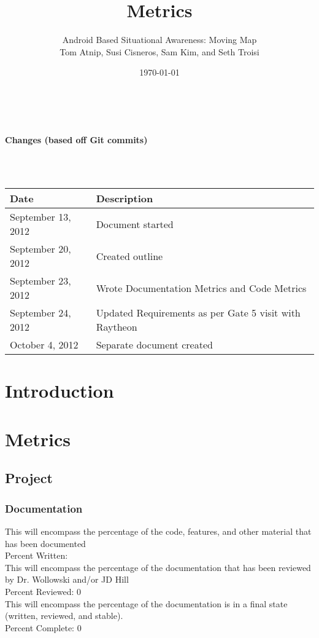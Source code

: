 \documentclass{article}
\begin{document}
\setlength{\voffset}{3.5in}
\title{Metrics}
\author{\Large Android Based Situational Awareness: Moving Map\\
Tom Atnip, Susi Cisneros, Sam Kim, and Seth Troisi}
\date{\today}
\maketitle
\clearpage
\setlength{\voffset}{0pt}
\tableofcontents
\clearpage
~\\
\begin{Large}\textbf{Changes (based off Git commits)}\end{Large}\\
~\\
\begin{tabular}{ | p{1.5in} | p{4.5in} | }
\hline
\textbf{Date} & \textbf{Description}\\
\hline
\hline
September 13, 2012 & Document started\\
\hline
September 20, 2012 & Created outline\\
\hline
September 23, 2012 & Wrote Documentation Metrics and Code Metrics\\
\hline
September 24, 2012 & Updated Requirements as per Gate 5 visit with Raytheon\\
\hline
October 4, 2012 & Separate document created\\
\hline
\end{tabular}
\clearpage

\section{Introduction}

\section{Metrics}
\subsection{Project}
\subsubsection{Documentation}
This will encompass the percentage of the code, features, and other material that has been documented\\
Percent Written:	\\
This will encompass the percentage of the documentation that has been reviewed by Dr. Wollowski and/or JD Hill\\
Percent Reviewed:	0\\
This will encompass the percentage of the documentation is in a final state (written, reviewed, and stable).\\
Percent Complete:	0\\
\end{document}
